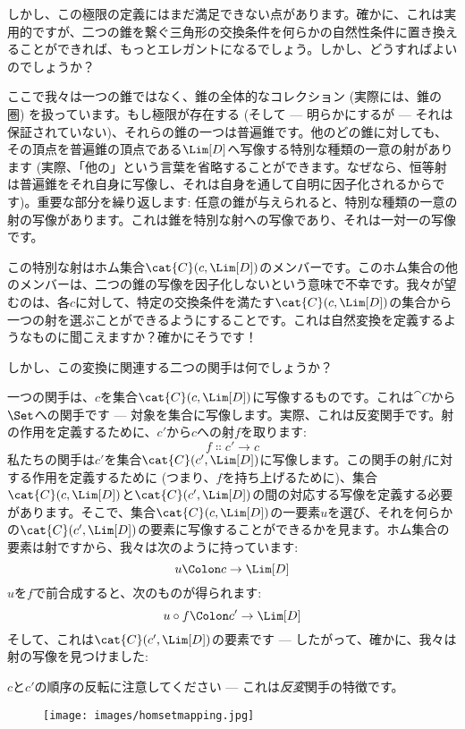 しかし、この極限の定義にはまだ満足できない点があります。確かに、これは実用的ですが、二つの錐を繋ぐ三角形の交換条件を何らかの自然性条件に置き換えることができれば、もっとエレガントになるでしょう。しかし、どうすればよいのでしょうか？

ここで我々は一つの錐ではなく、錐の全体的なコレクション (実際には、錐の圏) を扱っています。もし極限が存在する (そして --- 明らかにするが --- それは保証されていない)、それらの錐の一つは普遍錐です。他のどの錐に対しても、その頂点を普遍錐の頂点である$\Lim[D]$へ写像する特別な種類の一意の射があります (実際、「他の」という言葉を省略することができます。なぜなら、恒等射は普遍錐をそれ自身に写像し、それは自身を通して自明に因子化されるからです)。重要な部分を繰り返します: 任意の錐が与えられると、特別な種類の一意の射の写像があります。これは錐を特別な射への写像であり、それは一対一の写像です。

この特別な射はホム集合$\cat{C}(c, \Lim[D])$のメンバーです。このホム集合の他のメンバーは、二つの錐の写像を因子化しないという意味で不幸です。我々が望むのは、各$c$に対して、特定の交換条件を満たす$\cat{C}(c, \Lim[D])$の集合から一つの射を選ぶことができるようにすることです。これは自然変換を定義するようなものに聞こえますか？確かにそうです！

しかし、この変換に関連する二つの関手は何でしょうか？

一つの関手は、$c$を集合$\cat{C}(c, \Lim[D])$に写像するものです。これは$\cat{C}$から$\Set$への関手です --- 対象を集合に写像します。実際、これは反変関手です。射の作用を定義するために、$c'$から$c$への射$f$を取ります: 
\[f \Colon c' \to c\]
私たちの関手は$c'$を集合$\cat{C}(c', \Lim[D])$に写像します。この関手の射$f$に対する作用を定義するために (つまり、$f$を持ち上げるために)、集合$\cat{C}(c, \Lim[D])$と$\cat{C}(c', \Lim[D])$の間の対応する写像を定義する必要があります。そこで、集合$\cat{C}(c, \Lim[D])$の一要素$u$を選び、それを何らかの$\cat{C}(c', \Lim[D])$の要素に写像することができるかを見ます。ホム集合の要素は射ですから、我々は次のように持っています: 
\[u \Colon c \to \Lim[D]\]
$u$を$f$で前合成すると、次のものが得られます: 
\[u \circ f \Colon c' \to \Lim[D]\]
そして、これは$\cat{C}(c', \Lim[D])$の要素です --- したがって、確かに、我々は射の写像を見つけました: 

$c$と$c'$の順序の反転に注意してください --- これは\emph{反変}関手の特徴です。

\begin{figure}[H]
  \centering
  \texttt{[image: images/homsetmapping.jpg]}
\end{figure}

